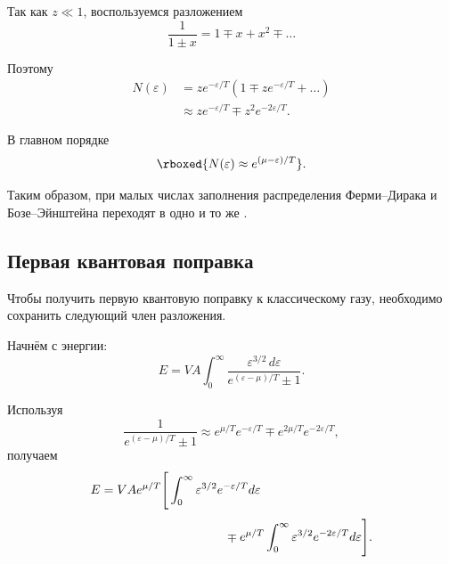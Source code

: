 \documentclass[../final.tex]{subfiles}
\begin{document}
Так как $z\ll1$, воспользуемся разложением
%
\begin{equation*}
    \frac{1}{1\pm x}
    =
    1
    \mp
    x
    +
    x^2
    \mp
    \ldots
\end{equation*}

Поэтому
%
\begin{align*}
    N(\varepsilon)
    &=
    ze^{-\varepsilon/T}
    \left(
        1
        \mp
        ze^{-\varepsilon/T}
        +
        \ldots
    \right)
    \\[4pt]
    &\approx
    ze^{-\varepsilon/T}
    \mp
    z^2e^{-2\varepsilon/T}.
\end{align*}

В главном порядке
%
\[
    \rboxed{
        N(\varepsilon)
        \approx
        e^{(\mu-\varepsilon)/T}
    }.
\]

Таким образом, при малых числах заполнения распределения
Ферми--Дирака и Бозе--Эйнштейна переходят в одно и то же
.


\subsection{Первая квантовая поправка}

Чтобы получить первую квантовую поправку к классическому газу,
необходимо сохранить следующий член разложения.

Начнём с энергии:
%
\begin{equation*}
    E
    =
    VA
    \int_0^\infty
    \frac{
        \varepsilon^{3/2}\,
        d\varepsilon
    }{
        e^{(\varepsilon-\mu)/T}\pm1
    }.
\end{equation*}

Используя
%
\begin{equation*}
    \frac{1}{
        e^{(\varepsilon-\mu)/T}\pm1
    }
    \approx
    e^{\mu/T}e^{-\varepsilon/T}
    \mp
    e^{2\mu/T}e^{-2\varepsilon/T},
\end{equation*}
%
получаем
%
\begin{align*}
    E
    &=
    VAe^{\mu/T}
    \Bigg[
        \int_0^\infty
        \varepsilon^{3/2}
        e^{-\varepsilon/T}
        d\varepsilon
        \\[4pt]
        &\hspace{3.5cm}
        \mp
        e^{\mu/T}
        \int_0^\infty
        \varepsilon^{3/2}
        e^{-2\varepsilon/T}
        d\varepsilon
    \Bigg].
\end{align*}
\end{document}
